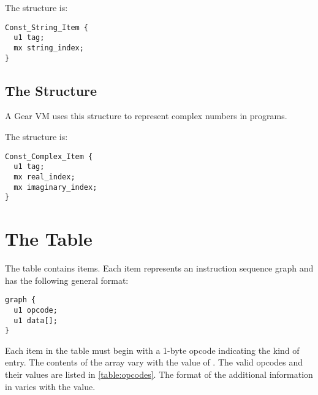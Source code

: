The  structure is:

\begin{minipage}{\linewidth}
\begin{lstlisting}
Const_String_Item {
  u1 tag;
  mx string_index;
}
\end{lstlisting}
\end{minipage}






\subsection{The  Structure}

A Gear VM uses this structure to represent complex numbers in programs. 

The  structure is:

\begin{minipage}{\linewidth}
\begin{lstlisting}
Const_Complex_Item {
  u1 tag;
  mx real_index;
  mx imaginary_index;
}
\end{lstlisting}
\end{minipage}





\section{The  Table}

The  table contains  items. Each item represents an instruction sequence graph and has the following general format:

\begin{minipage}{\linewidth}
\begin{lstlisting}
graph {
  u1 opcode;
  u1 data[];
}
\end{lstlisting}
\end{minipage}

Each item in the  table must begin with a 1-byte opcode indicating the kind of  entry. The contents of the  array vary with the value of . The valid opcodes and their values are listed in \autoref{table:opcodes}. The format of the additional information in  varies with the  value. 

